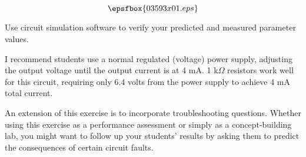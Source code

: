 

$$\epsfbox{03593x01.eps}$$

\vfil \eject






Use circuit simulation software to verify your predicted and measured parameter values.







I recommend students use a normal regulated (voltage) power supply, adjusting the output voltage until the output current is at 4 mA.  1 k$\Omega$ resistors work well for this circuit, requiring only 6.4 volts from the power supply to achieve 4 mA total current.

An extension of this exercise is to incorporate troubleshooting questions.  Whether using this exercise as a performance assessment or simply as a concept-building lab, you might want to follow up your students' results by asking them to predict the consequences of certain circuit faults.




